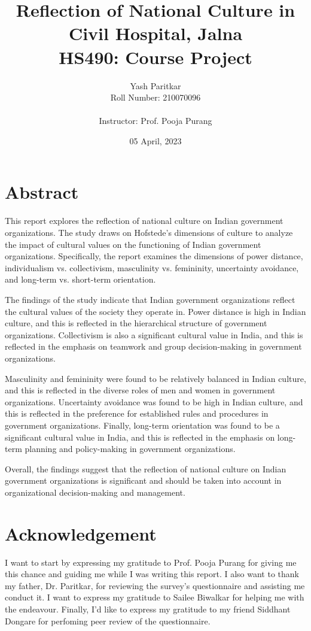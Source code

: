 \documentclass{article}
\title{\textbf{Reflection of National Culture in Civil Hospital, Jalna}\\
HS490: Course Project}
\author{Yash Paritkar\\
Roll Number: 210070096\\
\\
Instructor: Prof. Pooja Purang}
\date{05 April, 2023}
\begin{document}
\maketitle

\newpage
\section*{Abstract}
This report explores the reflection of national culture on Indian government organizations. The study draws on Hofstede's dimensions of culture to analyze the impact of cultural values on the functioning of Indian government organizations. Specifically, the report examines the dimensions of power distance, individualism vs. collectivism, masculinity vs. femininity, uncertainty avoidance, and long-term vs. short-term orientation.

The findings of the study indicate that Indian government organizations reflect the cultural values of the society they operate in. Power distance is high in Indian culture, and this is reflected in the hierarchical structure of government organizations. Collectivism is also a significant cultural value in India, and this is reflected in the emphasis on teamwork and group decision-making in government organizations.

Masculinity and femininity were found to be relatively balanced in Indian culture, and this is reflected in the diverse roles of men and women in government organizations. Uncertainty avoidance was found to be high in Indian culture, and this is reflected in the preference for established rules and procedures in government organizations. Finally, long-term orientation was found to be a significant cultural value in India, and this is reflected in the emphasis on long-term planning and policy-making in government organizations.

Overall, the findings suggest that the reflection of national culture on Indian government organizations is significant and should be taken into account in organizational decision-making and management. %

\newpage
\section*{Acknowledgement}
I want to start by expressing my gratitude to Prof. Pooja Purang for giving me this chance and guiding me while I was writing this report. I also want to thank my father, Dr. Paritkar, for reviewing the survey's questionnaire and assisting me conduct it. I want to express my gratitude to Sailee Biwalkar for helping me with the endeavour. Finally, I'd like to express my gratitude to my friend Siddhant Dongare for perfoming peer review of the questionnaire.
\end{document}
